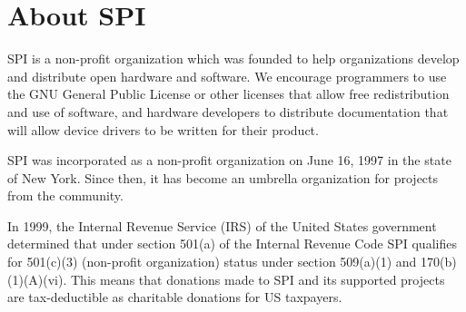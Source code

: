 \documentclass[a4paper]{report}
\begin{document}
\appendix
\chapter{About SPI}

SPI is a non-profit organization which was founded to help organizations develop and distribute open hardware and software. We encourage programmers to use the GNU General Public License or other licenses that allow free redistribution and use of software, and hardware developers to distribute documentation that will allow device drivers to be written for their product.

SPI was incorporated as a non-profit organization on June 16, 1997 in the state of New York. Since then, it has become an umbrella organization for projects from the community.

In 1999, the Internal Revenue Service (IRS) of the United States government determined that under section 501(a) of the Internal Revenue Code SPI qualifies for 501(c)(3) (non-profit organization) status under section 509(a)(1) and 170(b)(1)(A)(vi). This means that donations made to SPI and its supported projects are tax-deductible as charitable donations for US taxpayers.

\newpage

\pagestyle{empty}


\null
\end{document}
